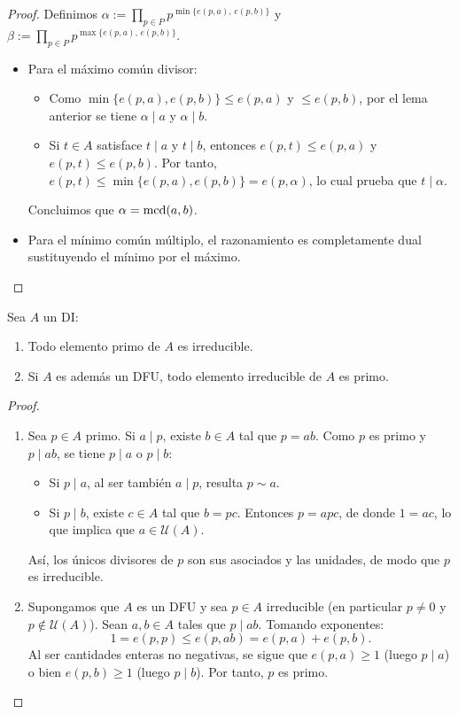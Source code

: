 \begin{proof}
    Definimos $\alpha := \prod\limits_{p \in P} p^{\min\{e(p,a),\, e(p,b)\}}$ y $\beta := \prod\limits_{p \in P} p^{\max\{e(p,a),\, e(p,b)\}}$.
    \begin{itemize}
        \item Para el máximo común divisor:
        \begin{itemize}
            \item Como $\min\{e(p,a), e(p,b)\} \leq e(p,a)$ y $\leq e(p,b)$, por el lema anterior se tiene $\alpha \mid a$ y $\alpha \mid b$.
            \item Si $t \in A$ satisface $t \mid a$ y $t \mid b$, entonces $e(p,t) \leq e(p,a)$ y $e(p,t) \leq e(p,b)$. Por tanto, $e(p,t) \leq \min\{e(p,a), e(p,b)\} = e(p,\alpha)$, lo cual prueba que $t \mid \alpha$.
        \end{itemize}
        Concluimos que $\alpha = \operatorname{mcd}(a,b)$.

        \item Para el mínimo común múltiplo, el razonamiento es completamente dual sustituyendo el mínimo por el máximo.
    \end{itemize}
\end{proof}

\begin{prop}\label{propPrimoIrreducible}
    Sea $A$ un DI:
    \begin{enumerate}[label=\arabic*)]
        \item Todo elemento primo de $A$ es irreducible.
        \item Si $A$ es además un DFU, todo elemento irreducible de $A$ es primo.
    \end{enumerate}
\end{prop}
\begin{proof}
    \leavevmode
    \begin{enumerate}[label=\arabic*)]
        \item Sea $p \in A$ primo. Si $a \mid p$, existe $b \in A$ tal que $p = ab$. Como $p$ es primo y $p \mid ab$, se tiene $p \mid a$ o $p \mid b$:
        \begin{itemize}
            \item Si $p \mid a$, al ser también $a \mid p$, resulta $p \sim a$.
            \item Si $p \mid b$, existe $c \in A$ tal que $b = pc$. Entonces $p = apc$, de donde $1 = ac$, lo que implica que $a \in \mathcal{U}(A)$.
        \end{itemize}
        Así, los únicos divisores de $p$ son sus asociados y las unidades, de modo que $p$ es irreducible.

        \item Supongamos que $A$ es un DFU y sea $p \in A$ irreducible (en particular $p \neq 0$ y $p \notin \mathcal{U}(A)$). Sean $a, b \in A$ tales que $p \mid ab$. Tomando exponentes:
        \[
            1 = e(p,p) \leq e(p,ab) = e(p,a) + e(p,b).
        \]
        Al ser cantidades enteras no negativas, se sigue que $e(p,a) \geq 1$ (luego $p \mid a$) o bien $e(p,b) \geq 1$ (luego $p \mid b$). Por tanto, $p$ es primo. \qedhere
    \end{enumerate}
\end{proof}

